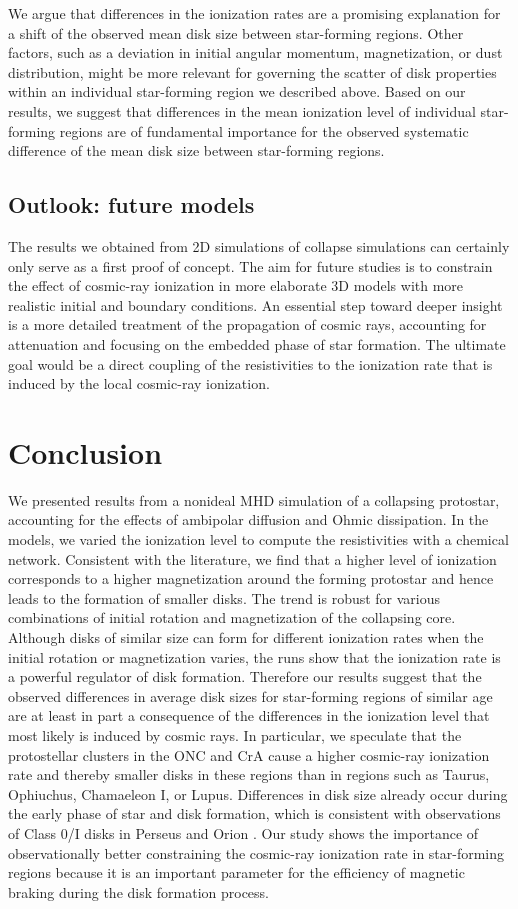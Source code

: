 \documentclass{aa}
\begin{document}
We argue that differences in the ionization rates are a promising explanation for a shift of the observed mean disk size between star-forming regions. 
Other factors, such as a deviation in initial angular momentum, magnetization, or dust distribution, might be more relevant for governing the scatter of disk properties within an individual star-forming region we described above. 
Based on our results, we suggest that differences in the mean ionization level of individual star-forming regions are of fundamental importance for the observed systematic difference of the mean disk size between star-forming regions. 

\subsection{Outlook: future models}
The results we obtained from 2D simulations of collapse simulations can certainly only serve as a first proof of concept. The aim for future studies is to constrain the effect of cosmic-ray ionization in more elaborate 3D models with more realistic initial and boundary conditions. 
An essential step toward deeper insight is a more detailed treatment of the propagation of cosmic rays, accounting for attenuation and focusing on the embedded phase of star formation. 
The ultimate goal would be a direct coupling of the resistivities to the ionization rate that is induced by the local cosmic-ray ionization.


\section{Conclusion}
We presented results from a nonideal MHD simulation of a collapsing protostar, accounting for the effects of ambipolar diffusion and Ohmic dissipation. 
In the models, we varied the ionization level to compute the resistivities with a chemical network.
Consistent with the literature, we find that a higher level of ionization corresponds to a higher magnetization around the forming protostar and hence leads to the formation of smaller disks. 
The trend is robust for various combinations of initial rotation and magnetization of the collapsing core. 
Although disks of similar size can form for different ionization rates when the initial rotation or magnetization varies, the runs show that the ionization rate is a powerful regulator of disk formation. Therefore our results suggest that the observed differences in average disk sizes for star-forming regions of similar age are at least in part a consequence of the differences in the ionization level that most likely is induced by cosmic rays. 
In particular, we speculate that the protostellar clusters in the ONC and CrA cause a higher cosmic-ray ionization rate and thereby smaller disks in these regions than in regions such as Taurus, Ophiuchus, Chamaeleon I, or Lupus. 
Differences in disk size already occur during the early phase of star and disk formation, which is consistent with observations of Class 0/I disks in Perseus and Orion \citep{Tobin2020}.
Our study shows the importance of observationally better constraining the cosmic-ray ionization rate in star-forming regions because it is an important parameter for the efficiency of magnetic braking during the disk formation process.
\end{document}
